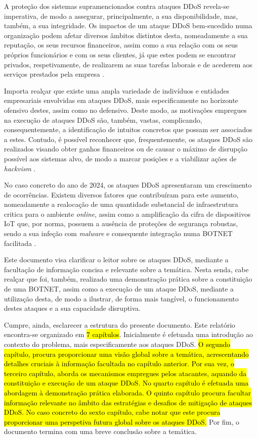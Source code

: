 A proteção dos sistemas supramencionados contra ataques DDoS revela-se imperativa, de modo a assegurar, principalmente, a sua disponibilidade, mas, também, a sua integridade. Os impactos de um ataque DDoS bem-sucedido numa organização podem afetar diversos âmbitos distintos desta, nomeadamente a sua reputação, os seus recursos financeiros, assim como a sua relação com os seus próprios funcionários e com os seus clientes, já que estes podem se encontrar privados, respetivamente, de realizarem as suas tarefas laborais e de acederem aos serviços prestados pela empresa \cite{kaspersky_how_ddos_works}.


Importa realçar que existe uma ampla variedade de indivíduos e entidades empresariais envolvidas em ataques DDoS, mais especificamente no horizonte ofensivo destes, assim como no defensivo. Deste modo, as motivações empregues na execução de ataques DDoS são, também, vastas, complicando, consequentemente, a identificação de intuitos concretos que possam ser associados a estes. Contudo, é possível reconhecer que, frequentemente, os ataques DDoS são realizados visando obter ganhos financeiros ou de causar o máximo de disrupção possível aos sistemas alvo, de modo a marcar posições e a viabilizar ações de \textit{hackvism} \cite{fortinet_what_is_ddos}.

No caso concreto do ano de 2024, os ataques DDoS apresentaram um crescimento de ocorrências. Existem diversos fatores que contribuíram para este aumento, nomeadamente a realocação de uma quantidade substancial de infraestrutura critica para o ambiente \textit{online}, assim como a amplificação da cifra de dispositivos IoT que, por norma, possuem a ausência de proteções de segurança robustas, sendo a sua infeção com \textit{malware} e consequente integração numa BOTNET facilitada \cite{arnold_rise_2024}.

Este documento visa clarificar o leitor sobre os ataques DDoS, mediante a facultação de informação concisa e relevante sobre a temática. Nesta senda, cabe realçar que foi, também, realizado uma demonstração prática sobre a constituição de uma BOTNET, assim como a execução de um ataque DDoS, mediante a utilização desta, de modo a ilustrar, de forma mais tangível, o funcionamento destes ataques e a sua capacidade disruptiva.

Cumpre, ainda, esclarecer a estrutura do presente documento. Este relatório encontra-se organizado em \hl{7 capítulos}. Inicialmente é efetuada uma introdução ao contexto do problema, mais especificamente aos ataques DDoS. \hl{O segundo capítulo, procura proporcionar uma visão global sobre a temática, acrescentando detalhes cruciais à informação facultada no capítulo anterior. Por sua vez, o terceiro capítulo, aborda os mecanismos empregues pelos atacantes, aquando da constituição e execução de um ataque DDoS. No quarto capítulo é efetuada uma abordagem à demonstração prática elaborada. O quinto capítulo procura facultar informação relevante no âmbito das estratégias e desafios de mitigação de ataques DDoS. No caso concreto do sexto capítulo, cabe notar que este procura proporcionar uma perspetiva futura global sobre os ataques DDoS.} Por fim, o documento termina com uma breve conclusão sobre a temática.